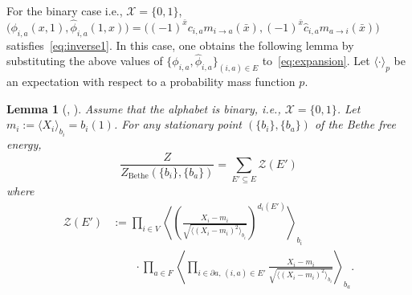\documentclass[a4paper,10pt,twoside,twocolumn,openany,final]{memoir}
\theoremstyle{plain}
\newtheorem{lemma}[theorem]{Lemma}
\theoremstyle{definition}
\theoremstyle{remark}
\begin{document}
For the binary case i.e., $\mathcal{X}=\{0,1\}$,
$\bigl(\phi_{i,a}(x, 1), \hat{\phi}_{i,a}(1, x)\bigr) 
= \bigl((-1)^{\bar{x}}c_{i,a}m_{i\to a}(\bar{x}), (-1)^{\bar{x}}\hat{c}_{i,a}m_{a\to i}(\bar{x})\bigr)$
satisfies~\eqref{eq:inverse1}.
In this case, one obtains the following lemma by substituting
the above values of $\{\phi_{i,a}, \hat{\phi}_{i,a}\}_{(i,a)\in E}$ to~\eqref{eq:expansion}.
Let $\langle\cdot\rangle_{p}$ be an expectation with respect to a probability mass function $p$.
\begin{lemma}[\cite{chertkov2006loop}, \cite{sudderth2008loop}]\label{lem:loop}
Assume that the alphabet is binary, i.e., $\mathcal{X}=\{0,1\}$.
Let $m_i:=\langle X_i\rangle_{b_i}= b_i(1)$.
For any stationary point $(\{b_i\}, \{b_a\})$ of the Bethe free energy,
\begin{equation}
\frac{Z}{Z_\mathrm{Bethe}(\{b_i\},\{b_a\})} = \sum_{E'\subseteq E} \mathcal{Z}(E')
\label{eq:loop}
\end{equation}
where
\begin{align*}
\mathcal{Z}(E')&:=
\prod_{i\in V}\left\langle\left(\frac{X_i-m_i}{\sqrt{\langle(X_i-m_i)^2\rangle_{b_i}}}\right)^{d_i(E')}\right\rangle_{b_i}\\
&\qquad\cdot\prod_{a\in F}\left\langle\prod_{i\in \partial a,\, (i,a)\in E'}\frac{X_i-m_i}{\sqrt{\langle(X_i-m_i)^2\rangle_{b_i}}}\right\rangle_{b_a}.
\end{align*}
\end{lemma}
\end{document}
